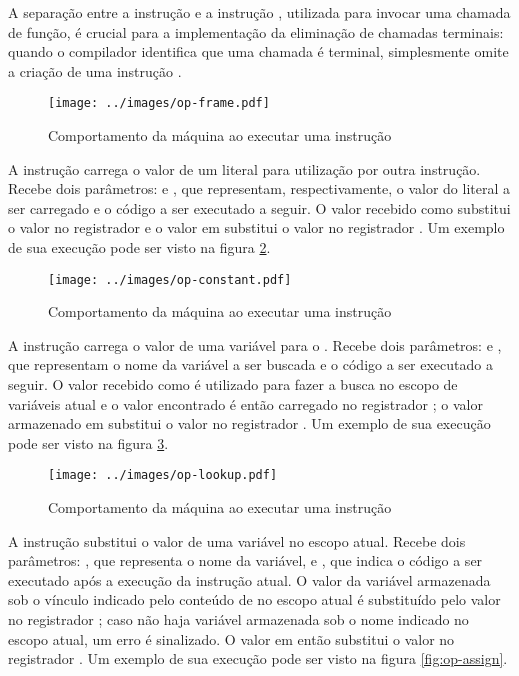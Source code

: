 A separação entre a instrução  e a instrução ,
utilizada para invocar uma chamada de função, é crucial para a implementação da
eliminação de chamadas terminais: quando o compilador identifica que uma
chamada é terminal, simplesmente omite a criação de uma instrução .

\begin{figure}[h!]
\centering
\texttt{[image: ../images/op-frame.pdf]}
\caption{Comportamento da máquina ao executar uma instrução }
\label{fig:op-frame}
\end{figure}


A instrução   carrega o valor de um literal
para utilização por outra instrução. Recebe dois parâmetros:  e
, que representam, respectivamente, o valor do literal a ser
carregado e o código a ser executado a seguir. O valor recebido como
 substitui o valor no registrador  e o valor em
 substitui o valor no registrador . Um exemplo de sua execução pode ser visto na figura
\ref{fig:op-constant}.

\begin{figure}[h!]
\centering
\texttt{[image: ../images/op-constant.pdf]}
\caption{Comportamento da máquina ao executar uma instrução }
\label{fig:op-constant}
\end{figure}


A instrução   carrega o valor de uma variável
para o . Recebe dois parâmetros:  e ,
que representam o nome da variável a ser buscada e o código a ser executado a
seguir. O valor recebido como  é utilizado para fazer a busca no
escopo de variáveis atual e o valor encontrado é então carregado no registrador
; o valor armazenado em  substitui o valor no
registrador . Um exemplo de sua execução pode ser visto na figura
\ref{fig:op-lookup}.

\begin{figure}[h!]
\centering
\texttt{[image: ../images/op-lookup.pdf]}
\caption{Comportamento da máquina ao executar uma instrução }
\label{fig:op-lookup}
\end{figure}


A instrução   substitui o valor de uma variável
no escopo atual. Recebe dois parâmetros: , que representa o nome da
variável, e , que indica o código a ser executado após a execução
da instrução atual. O valor da variável armazenada sob o vínculo indicado pelo
conteúdo de  no escopo atual é substituído pelo valor no registrador
; caso não haja variável armazenada sob o nome indicado no
escopo atual, um erro é sinalizado.  O valor em  então substitui
o valor no registrador . Um exemplo de sua execução pode ser visto na figura
\ref{fig:op-assign}.

